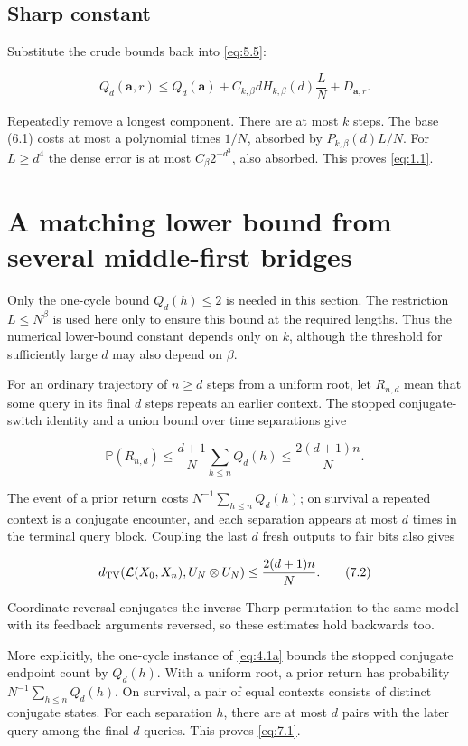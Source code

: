 \documentclass[11pt]{article}
\theoremstyle{remark}
\begin{document}
\subsection{Sharp constant}\label{sharp-constant}

Substitute the crude bounds back into \eqref{eq:5.5}:

\[
 Q_d(\mathbf a,r)\le Q_d(\mathbf a)+C_{k,\beta}dH_{k,\beta}(d)\frac LN+D_{\mathbf a,r}.
\]

Repeatedly remove a longest component. There are at most \(k\) steps.
The base (6.1) costs at most a polynomial times \(1/N\), absorbed by
\(P_{k,\beta}(d)L/N\). For \(L\ge d^4\) the dense error is at most
\(C_\beta2^{-d^3}\), also absorbed. This proves \eqref{eq:1.1}.

\section{A matching lower bound from several middle-first
bridges}\label{a-matching-lower-bound-from-several-middle-first-bridges}

Only the one-cycle bound \(Q_d(h)\le2\) is needed in this section. The
restriction \(L\le N^\beta\) is used here only to ensure this bound at
the required lengths. Thus the numerical lower-bound constant depends
only on \(k\), although the threshold for sufficiently large \(d\) may
also depend on \(\beta\).

For an ordinary trajectory of \(n\ge d\) steps from a uniform root, let
\(R_{n,d}\) mean that some query in its final \(d\) steps repeats an
earlier context. The stopped conjugate-switch identity and a union bound
over time separations give

\[
 \mathbb P(R_{n,d})\le\frac{d+1}{N}\sum_{h\le n}Q_d(h)
 \le\frac{2(d+1)n}{N}.
 \tag{7.1}\label{eq:7.1}
\]

The event of a prior return costs \(N^{-1}\sum_{h\le n}Q_d(h)\); on
survival a repeated context is a conjugate encounter, and each
separation appears at most \(d\) times in the terminal query block.
Coupling the last \(d\) fresh outputs to fair bits also gives

\[
 d_{\rm TV}(\mathcal L(X_0,X_n),U_N\otimes U_N)
 \le\frac{2(d+1)n}{N}.
 \tag{7.2}\label{eq:7.2}
\]

Coordinate reversal conjugates the inverse Thorp permutation to the same
model with its feedback arguments reversed, so these estimates hold
backwards too.

More explicitly, the one-cycle instance of \eqref{eq:4.1a} bounds the stopped
conjugate endpoint count by \(Q_d(h)\). With a uniform root, a prior
return has probability \(N^{-1}\sum_{h\le n}Q_d(h)\). On survival, a
pair of equal contexts consists of distinct conjugate states. For each
separation \(h\), there are at most \(d\) pairs with the later query
among the final \(d\) queries. This proves \eqref{eq:7.1}.
\end{document}
